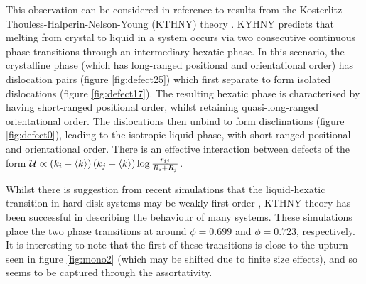 This observation can be considered in reference to results from the Kosterlitz\--Thouless\--Halperin\--Nelson\--Young (KTHNY) theory
\cite{Kosterlitz1973,Nelson1979,Young1979}.
KYHNY predicts that melting from crystal to liquid in a \td{} system occurs via two consecutive continuous phase transitions through an intermediary hexatic phase. 
In this scenario, the crystalline phase (which has long\--ranged positional and orientational order) has dislocation pairs (figure \ref{fig:defect25}) which first separate to form isolated dislocations (figure \ref{fig:defect17}).
The resulting hexatic phase is characterised by having short\--ranged positional order, whilst retaining quasi\--long\--ranged orientational order.
The dislocations then unbind to form disclinations (figure \ref{fig:defect0}), leading to the isotropic liquid phase, with short\--ranged positional and orientational order.
There is an effective interaction between defects of the form $\mathcal{U}\propto \left(k_i-\langle k \rangle\right)\left(k_j-\langle k \rangle\right)\log \frac{r_{ij}}{R_i+R_j}$.

Whilst there is suggestion from recent simulations that the liquid\--hexatic transition in hard disk systems may be weakly first order \cite{Bernard2011}, KTHNY theory has been successful in describing the behaviour of many \td{} systems.
These simulations place the two phase transitions at around $\phi=0.699$ and $\phi=0.723$, respectively.
It is interesting to note that the first of these transitions is close to the upturn seen in figure \ref{fig:mono2} (which may be shifted due to finite size effects), and so seems to be captured through the assortativity.

